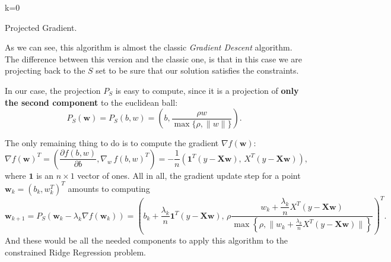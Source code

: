 \documentclass[11pt,table]{article}
\begin{document}
\begin{algorithm}[H]
	\SetNoFillComment
	\SetAlgoLined
	\DontPrintSemicolon
	k=0\;
	\caption{Projected Gradient.}
\end{algorithm}

As we can see, this algorithm is almost the classic \emph{Gradient Descent} algorithm. The difference between this version and the classic one, is that in this case we are projecting back to the \(S\) set to be sure that our solution satisfies the constraints.

In our case, the projection \(P_S\) is easy to compute, since it is a projection of \textbf{only the second component} to the euclidean ball:
\[
	P_S(\mathbf{w}) = P_S(b, w) = \left(b, \frac{\rho w}{\max\{\rho, \|w\|\}}\right).
\]

The only remaining thing to do is to compute the gradient $\nabla f(\mathbf{w})$:
\[
	\nabla f(\mathbf{w})^T = \left(\frac{\partial f(b, w)}{\partial b}, \nabla_w \, f(b, w)^T \right) =  -\frac{1}{n}\left(\boldsymbol{1}^T(y-\mathbf{X}\mathbf{w}), \, X^T(y-\mathbf{X}\mathbf{w})\right),
\]
where $\boldsymbol{1}$ is an $n\times 1$ vector of ones. All in all, the gradient update step for a point $\mathbf{w}_k = (b_k, w_k^T)^T$ amounts to computing
\[
	\mathbf{w}_{k+1} = P_S(\mathbf{w}_k-\lambda_k\nabla f(\mathbf{w}_k)) = \left(b_k + \frac{\lambda_k}{n} \boldsymbol{1}^T(y-\mathbf{X}\mathbf{w}), \, \rho \frac{w_k + \dfrac{\lambda_k}{n} X^T(y-\mathbf{X}\mathbf{w})}{\max \left\{ \rho, \|w_k + \frac{\lambda_k}{n} X^T(y-\mathbf{X} \mathbf{w})\|\right\}} \right)^T.
\]
And these would be all the needed components to apply this algorithm to the constrained Ridge Regression problem.
\end{document}
